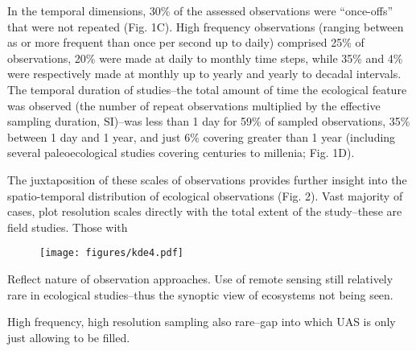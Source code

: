 \documentclass[12pt]{article}
\begin{document}
In the temporal dimensions, 30\% of the assessed observations were ``once-offs'' that were not repeated (Fig. 1C). High frequency observations (ranging between as or more frequent than once per second up to daily) comprised 25\% of observations, 20\% were made at daily to monthly time steps, while 35\% and 4\% were respectively made at monthly up to yearly and yearly to decadal intervals.  The temporal duration of studies--the total amount of time the ecological feature was observed (the number of repeat observations multiplied by the effective sampling duration, SI)--was less than 1 day for 59\% of sampled observations,  35\% between 1 day and 1 year, and just 6\% covering greater than 1 year (including several paleoecological studies covering centuries to millenia; Fig. 1D). 

The juxtaposition of these scales of observations provides further insight into the spatio-temporal distribution of ecological observations (Fig. 2).  
Vast majority of cases, plot resolution scales directly with the total extent of the study--these are field studies.  Those with 

\begin{figure}[!ht]
\texttt{[image: figures/kde4.pdf]}
\vspace{-0.15 cm}
\caption{}
\label{afoto1}
\end{figure}


Reflect nature of observation approaches. 
Use of remote sensing still relatively rare in ecological studies--thus the synoptic view of ecosystems not being seen.  

High frequency, high resolution sampling also rare--gap into which UAS is only just allowing to be filled. 
\end{document}
